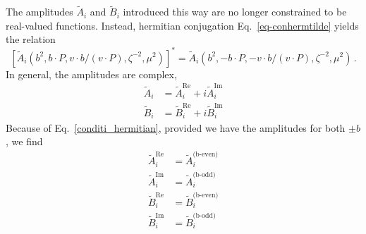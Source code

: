 \documentclass[]{article}
\numberwithin{equation}{section}
\newcommand{\tcdot}{{\cdot}}
\newcommand{\tAmp}{\widetilde{A}}
\newcommand{\tBmp}{\widetilde{B}}
\newcommand{\tAmp}{\ensuremath{\widetilde{A}^{(+)}}}
\newcommand{\tBmp}{\ensuremath{\widetilde{B}^{(+)}}}
\newcommand{\elll}{b}
\begin{document}
The amplitudes $\tAmp_i$ and $\tBmp_i$ introduced this way are no longer constrained to be real-valued functions. Instead, hermitian conjugation Eq.\ \eqref{eq-conhermtilde} yields the relation
\begin{equation}
	\left[ \tAmp_i(\elll^2,\elll \tcdot P, v \tcdot \elll / (v \tcdot P), \zeta^{-2},\mu^2) \right]^* = \tAmp_i(\elll^2,-\elll \tcdot P, -v \tcdot \elll / (v \tcdot P), \zeta^{-2},\mu^2)\, .\label{conditi_hermitian}
\end{equation}
In general, the amplitudes are complex,
\begin{align}
    \tilde{A}_i&=\tilde{A}^{\text{Re}}_i+i\tilde{A}^{\text{Im}}_i\\
    \tilde{B}_i&=\tilde{B}^{\text{Re}}_i+i\tilde{B}^{\text{Im}}_i
\end{align}
Because of Eq.\ \eqref{conditi_hermitian}, provided we have the amplitudes for both $\pm b$, we find
\begin{align}
    \tilde{A}^{\text{Re}}_i&=\tilde{A}^{\text{(b-even)}}_i\\
    \tilde{A}^{\text{Im}}_i&=\tilde{A}^{\text{(b-odd})}_i\\
    \tilde{B}^{\text{Re}}_i&=\tilde{B}^{\text{(b-even)}}_i\\
    \tilde{B}^{\text{Im}}_i&=\tilde{B}^{\text{(b-odd})}_i
\end{align}
\end{document}
